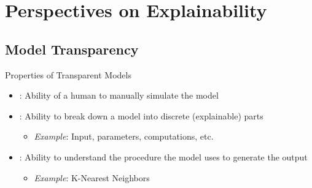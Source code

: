 \documentclass[11pt,dvipsnames,usenames,aspectratio=169]{beamer}  %
\begin{document}
\section{Perspectives on Explainability}
\subsection{Model Transparency}

\begin{frame}{Properties of Transparent Models}{}

  \vspace{20pt}
  \begin{itemize}[<+->]
    \setlength{\itemsep}{12pt}
    \item {}: Ability of a human to manually simulate the model

    \item {}: Ability to break down a model into discrete (explainable) parts
      \begin{itemize}
        \item \textit{Example}: Input, parameters, computations, etc.
      \end{itemize}

    \item {}: Ability to understand the procedure the model uses to generate the output
      \begin{itemize}
        \item \textit{Example}: K-Nearest Neighbors
      \end{itemize}
  \end{itemize}
\end{frame}
\end{document}
